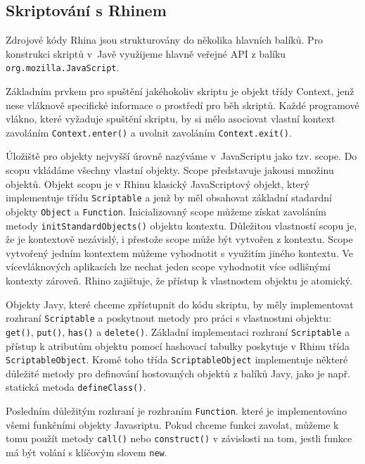 \subsection{Skriptování s Rhinem}
\label{Chapter.JavaScriptInJavaAnalysis.Rhino.ScriptingWithRhino}

Zdrojové kódy Rhina jsou strukturovány do několika hlavních balíků. Pro konstrukci skriptů v~Javě využijeme hlavně veřejné API z balíku \texttt{org.mozilla.JavaScript}.

Základním prvkem pro spuštění jakéhokoliv skriptu je objekt třídy Context, jenž nese vláknově specifické informace o prostředí pro běh skriptů. Každé programové vlákno, které vyžaduje spuštění skriptu, by si mělo asociovat vlastní kontext zavoláním \texttt{Context.enter()} a uvolnit zavoláním \texttt{Context.exit()}. \cite{Bibliography.Rhino.ScopesAndContexts}

Úložiště pro objekty nejvyšší úrovně nazýváme v~JavaScriptu jako tzv. scope. Do scopu vkládáme všechny vlastní objekty. Scope představuje jakousi množinu objektů. Objekt scopu je v Rhinu klasický JavaScriptový objekt, který implementuje třídu \texttt{Scriptable} a jenž by měl obsahovat základní stadardní objekty \texttt{Object} a \texttt{Function}. Inicializovaný scope můžeme získat zavoláním metody \texttt{initStandardObjects()} objektu kontextu. Důležitou vlastností scopu je, že je kontextově nezávislý, i přestože scope může být vytvořen z kontextu. Scope vytvořený jedním kontextem můžeme vyhodnotit s využitím jiného kontextu. Ve vícevláknových aplikacích lze nechat jeden scope vyhodnotit více odlišnými kontexty zároveň. Rhino zajištuje, že přístup k vlastnostem objektu je atomický. \cite{Bibliography.Rhino.ScopesAndContexts}

Objekty Javy, které chceme zpřístupnit do kódu skriptu, by měly implementovat rozhraní \texttt{Scriptable} a poskytnout metody pro práci s vlastnostmi objektu: \texttt{get()}, \texttt{put()}, \texttt{has()} a \texttt{delete()}. Základní implementaci rozhraní \texttt{Scriptable} a přístup k atributům objektu pomocí hashovací tabulky poskytuje v Rhinu třída \texttt{ScriptableObject}. Kromě toho třída \texttt{ScriptableObject} implementuje některé důležité metody pro definování hostovaných objektů z balíků Javy, jako je např. statická metoda \texttt{defineClass()}.

Posledním důležitým rozhraní je rozhraním \texttt{Function}. které je implementováno všemi funkčními objekty Javasriptu. Pokud chceme funkci zavolat, můžeme k tomu použít metody \texttt{call()} nebo \texttt{construct()} v závislosti na tom, jestli funkce má být volání s klíčovým slovem \texttt{new}.

